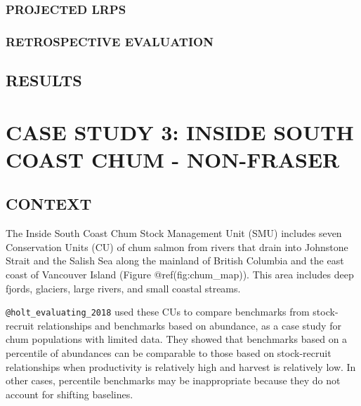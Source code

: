 \documentclass[11pt]{book}
\begin{document}
\hypertarget{projected-lrps-1}{%
\subsubsection{PROJECTED LRPS}\label{projected-lrps-1}}

\hypertarget{retrospective-evaluation-1}{%
\subsubsection{RETROSPECTIVE EVALUATION}\label{retrospective-evaluation-1}}

\hypertarget{results-1}{%
\subsection{RESULTS}\label{results-1}}

\hypertarget{case-study-3-inside-south-coast-chum---non-fraser}{%
\section{CASE STUDY 3: INSIDE SOUTH COAST CHUM - NON-FRASER}\label{case-study-3-inside-south-coast-chum---non-fraser}}

\hypertarget{context-2}{%
\subsection{CONTEXT}\label{context-2}}

The Inside South Coast Chum Stock Management Unit (SMU) includes seven Conservation Units (CU) of chum salmon from rivers that drain into Johnstone Strait and the Salish Sea along the mainland of British Columbia and the east coast of Vancouver Island (Figure @ref(fig:chum\_map)). This area includes deep fjords, glaciers, large rivers, and small coastal streams.

\texttt{@holt\_evaluating\_2018} used these CUs to compare benchmarks from stock-recruit relationships and benchmarks based on abundance, as a case study for chum populations with limited data. They showed that benchmarks based on a percentile of abundances can be comparable to those based on stock-recruit relationships when productivity is relatively high and harvest is relatively low. In other cases, percentile benchmarks may be inappropriate because they do not account for shifting baselines.
\end{document}
